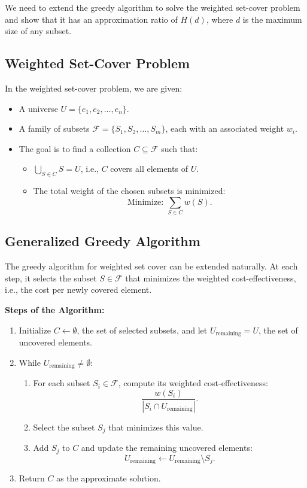 \documentclass[10pt,letter,notitlepage]{article}
\begin{document}
\begin{Answer}

We need to extend the greedy algorithm to solve the weighted set-cover problem and show that it has an approximation ratio of \(H(d)\), where \(d\) is the maximum size of any subset.

\subsection*{Weighted Set-Cover Problem}

In the weighted set-cover problem, we are given:
\begin{itemize}
    \item A universe \(U = \{e_1, e_2, \dots, e_n\}\).
    \item A family of subsets \(\mathcal{F} = \{S_1, S_2, \dots, S_m\}\), each with an associated weight \(w_i\).
    \item The goal is to find a collection \(C \subseteq \mathcal{F}\) such that:
    \begin{itemize}
        \item \(\bigcup_{S \in C} S = U\), i.e., \(C\) covers all elements of \(U\).
        \item The total weight of the chosen subsets is minimized:
        \[
        \text{Minimize: } \sum_{S \in C} w(S).
        \]
    \end{itemize}
\end{itemize}

\subsection*{Generalized Greedy Algorithm}

The greedy algorithm for weighted set cover can be extended naturally. At each step, it selects the subset \(S \in \mathcal{F}\) that minimizes the weighted cost-effectiveness, i.e., the cost per newly covered element.

\textbf{Steps of the Algorithm:}
\begin{enumerate}
    \item Initialize \(C \gets \emptyset\), the set of selected subsets, and let \(U_{\text{remaining}} = U\), the set of uncovered elements.
    \item While \(U_{\text{remaining}} \neq \emptyset\):
    \begin{enumerate}
        \item For each subset \(S_i \in \mathcal{F}\), compute its weighted cost-effectiveness:
        \[
        \frac{w(S_i)}{|S_i \cap U_{\text{remaining}}|}.
        \]
        \item Select the subset \(S_j\) that minimizes this value.
        \item Add \(S_j\) to \(C\) and update the remaining uncovered elements:
        \[
        U_{\text{remaining}} \gets U_{\text{remaining}} \setminus S_j.
        \]
    \end{enumerate}
    \item Return \(C\) as the approximate solution.
\end{enumerate}


\end{Answer}
\end{document}
